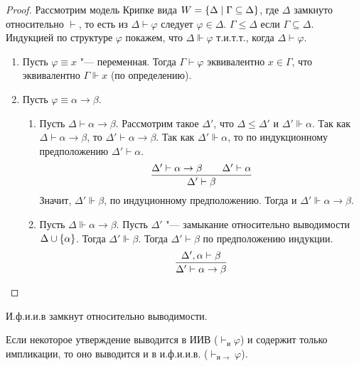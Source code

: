 \begin{proof}
    Рассмотрим модель Крипке вида $W = \left\{\Delta \mid \Gamma \subseteq \Delta\right\}$, где $\Delta$ замкнуто относительно $\vdash$,
    то есть из $\Delta \vdash \varphi$ следует $\varphi \in \Delta$.
    $\Gamma \leq \Delta$ если $\Gamma \subseteq \Delta$.
    Индукцией по структуре $\varphi$ покажем, что $\Delta \Vdash \varphi$ т.и.т.т., когда $\Delta \vdash \varphi$.
    \begin{enumerate}
        \item Пусть $\varphi \equiv x$ "--- переменная. Тогда $\Gamma \vdash \varphi$ эквивалентно $x \in \Gamma$, что эквивалентно $\Gamma\Vdash x$ (по определению).
        \item Пусть $\varphi \equiv \alpha \rightarrow \beta$.
        \begin{enumerate}[label=(\asbuk*)]
            \item Пусть $\Delta \vdash \alpha\rightarrow\beta$.
                Рассмотрим такое $\Delta'$, что $\Delta \leq \Delta'$ и $\Delta' \Vdash \alpha$.
                Так как $\Delta \vdash \alpha\rightarrow\beta$, то $\Delta' \vdash \alpha\rightarrow\beta$.
                Так как $\Delta' \Vdash \alpha$, то по индукционному предположению $\Delta' \vdash \alpha$.
                \[
                    \infer{\Delta' \vdash \beta}{\Delta' \vdash \alpha \rightarrow \beta && \Delta' \vdash \alpha}
                \]
                Значит, $\Delta' \Vdash \beta$, по индуционному предположению. Тогда и $\Delta' \Vdash \alpha\rightarrow\beta$.
            \item Пусть $\Delta \Vdash \alpha\rightarrow\beta$.
                Пусть $\Delta'$ "--- замыкание относительно выводимости $\Delta \cup \left\{\alpha\right\}$.
                Тогда $\Delta' \Vdash \beta$. Тогда $\Delta' \vdash \beta$ по предположению индукции.
                \[
                    \infer{\Delta' \vdash \alpha \rightarrow \beta}{\Delta', \alpha \vdash \beta} 
                    \qedhere
                \]
        \end{enumerate}
    \end{enumerate}
\end{proof}

\begin{corollary}
    И.ф.и.и.в замкнут относительно выводимости.
\end{corollary}
Если некоторое утверждение выводится в ИИВ ($\vdash_{и} \varphi$) и содержит только импликации,
то оно выводится и в и.ф.и.и.в. ($\vdash_{и \rightarrow} \varphi$).
